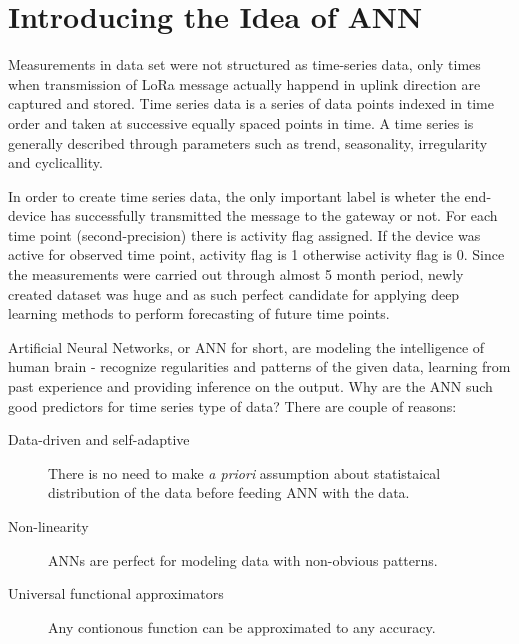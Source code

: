 \documentclass[10pt, a4paper]{article} %
\begin{document}
\section{Introducing the Idea of ANN}

Measurements in data set were not structured as time-series data, only times when transmission of LoRa message actually happend in uplink direction are captured and stored. 
Time series data is a series of data points indexed in time order and taken at successive equally spaced points in time. A time series is generally described through parameters such as trend, seasonality, irregularity and cyclicallity. \cite{Adhikari_timeseries}

In order to create time series data, the only important label is wheter the end-device has successfully transmitted the message to the gateway or not. 
For each time point (second-precision) there is activity flag assigned. If the device was active for observed time point, activity flag is 1 otherwise activity flag is 0.
Since the measurements were carried out through almost 5 month period, newly created dataset was huge and as such perfect candidate for applying deep learning methods to perform forecasting of future time points.

Artificial Neural Networks, or ANN for short, are modeling the intelligence of human brain - recognize regularities and patterns of the given data, learning from past experience and providing inference on the output. \cite{Adhikari_timeseries}
Why are the ANN such good predictors for time series type of data? There are couple of reasons:
\begin{description}
	\item[Data-driven and self-adaptive] There is no need to make \emph{a priori} assumption about statistaical distribution of the data before feeding ANN with the data. \cite{Adhikari_timeseries}
	\item [Non-linearity] ANNs are perfect for modeling data with non-obvious patterns. \cite{Zhang_ann}
	\item [Universal functional approximators] Any contionous function can be approximated to any accuracy. \cite{Hornik_ann}
\end{description}
\end{document}
